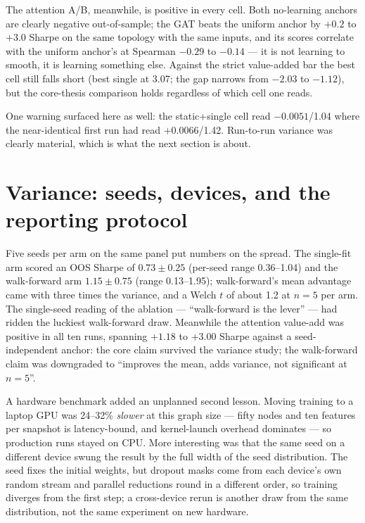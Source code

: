 The attention A/B, meanwhile, is positive in every cell. Both no-learning
anchors are clearly negative out-of-sample; the GAT beats the uniform
anchor by $+0.2$ to $+3.0$ Sharpe on the same topology with the same
inputs, and its scores correlate with the uniform anchor's at Spearman
$-0.29$ to $-0.14$ --- it is not learning to smooth, it is learning
something else. Against the strict value-added bar the best cell still
falls short (best single at 3.07; the gap narrows from $-2.03$ to
$-1.12$), but the core-thesis comparison holds regardless of which cell
one reads.

One warning surfaced here as well: the static+single cell read
$-0.0051$/1.04 where the near-identical first run had read $+0.0066$/1.42.
Run-to-run variance was clearly material, which is what the next section
is about.

\section{Variance: seeds, devices, and the reporting protocol}
\label{sec:eq-variance}

Five seeds per arm on the same panel put numbers on the spread. The
single-fit arm scored an OOS Sharpe of $0.73 \pm 0.25$ (per-seed range
0.36--1.04) and the walk-forward arm $1.15 \pm 0.75$ (range 0.13--1.95);
walk-forward's mean advantage came with three times the variance, and a
Welch $t$ of about 1.2 at $n=5$ per arm. The single-seed reading of the
ablation --- ``walk-forward is the lever'' --- had ridden the luckiest
walk-forward draw. Meanwhile the attention value-add was positive in all
ten runs, spanning $+1.18$ to $+3.00$ Sharpe against a seed-independent
anchor: the core claim survived the variance study; the walk-forward
claim was downgraded to ``improves the mean, adds variance, not
significant at $n=5$''.

A hardware benchmark added an unplanned second lesson. Moving training to
a laptop GPU was 24--32\% \emph{slower} at this graph size --- fifty
nodes and ten features per snapshot is latency-bound, and kernel-launch
overhead dominates --- so production runs stayed on CPU. More
interesting was that the same seed on a different device swung the result
by the full width of the seed distribution. The seed fixes the initial
weights, but dropout masks come from each device's own random stream and
parallel reductions round in a different order, so training diverges from
the first step; a cross-device rerun is another draw from the same
distribution, not the same experiment on new hardware.

